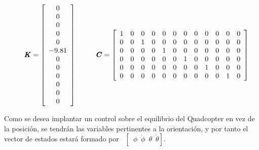 \documentclass[twoside]{article}
\begin{document}
\begin{equation}
\hspace*{0.5cm} \pmb{K}= \left[ \begin{array}{c}
0 \\
0 \\
0 \\
0 \\
0 \\
-9.81 \\
0 \\
0 \\
0 \\
0 \\
0 \\
0 \\ \end{array} \right]  \hspace*{1cm} \pmb{C}=\left[ \begin{array}{cccccccccccc}
1 & 0 & 0 & 0 & 0 & 0 & 0 & 0 & 0 & 0 & 0 & 0 \\
0 & 0 & 1 & 0 & 0 & 0 & 0 & 0 & 0 & 0 & 0 & 0 \\
0 & 0 & 0 & 0 & 1 & 0 & 0 & 0 & 0 & 0 & 0 & 0 \\
0 & 0 & 0 & 0 & 0 & 0 & 1 & 0 & 0 & 0 & 0 & 0 \\
0 & 0 & 0 & 0 & 0 & 0 & 0 & 0 & 1 & 0 & 0 & 0 \\
0 & 0 & 0 & 0 & 0 & 0 & 0 & 0 & 0 & 0 & 1 & 0 \\ \end{array} \right]
\end{equation}



Como se desea implantar un control sobre el equilibrio del Quadcopter en vez de la posición, se tendrán las variables pertinentes a la orientación, y por tanto el vector de estados estará formado por %
$\enspace \left[ \enspace \phi \enspace \dot{\phi} \enspace \theta \enspace \dot{\theta} \right]$. 
\end{document}
